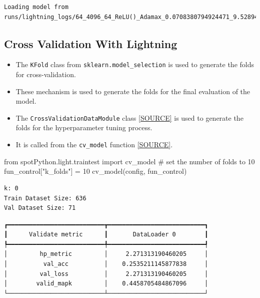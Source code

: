 \documentclass[
  letterpaper,
  DIV=11,
  numbers=noendperiod]{scrreprt}
\newenvironment{Shaded}{\begin{snugshade}}{\end{snugshade}}
\newcommand{\CommentTok}[1]{\textcolor[rgb]{0.37,0.37,0.37}{#1}}
\newcommand{\DecValTok}[1]{\textcolor[rgb]{0.68,0.00,0.00}{#1}}
\newcommand{\ImportTok}[1]{\textcolor[rgb]{0.00,0.46,0.62}{#1}}
\newcommand{\NormalTok}[1]{\textcolor[rgb]{0.00,0.23,0.31}{#1}}
\newcommand{\OperatorTok}[1]{\textcolor[rgb]{0.37,0.37,0.37}{#1}}
\newcommand{\StringTok}[1]{\textcolor[rgb]{0.13,0.47,0.30}{#1}}
\providecommand{\tightlist}{%
  \setlength{\itemsep}{0pt}\setlength{\parskip}{0pt}}\usepackage{longtable,booktabs,array}
\begin{document}
\begin{verbatim}
Loading model from runs/lightning_logs/64_4096_64_ReLU()_Adamax_0.0708380794924471_9.528945328733357_4_Xavier_TEST/checkpoints/last.ckpt
\end{verbatim}

\hypertarget{cross-validation-with-lightning}{%
\subsection{Cross Validation With
Lightning}\label{cross-validation-with-lightning}}

\begin{itemize}
\tightlist
\item
  The \texttt{KFold} class from \texttt{sklearn.model\_selection} is
  used to generate the folds for cross-validation.
\item
  These mechanism is used to generate the folds for the final evaluation
  of the model.
\item
  The \texttt{CrossValidationDataModule} class
  \href{https://github.com/sequential-parameter-optimization/spotPython/blob/main/src/spotPython/light/crossvalidationdatamodule.py}{{[}SOURCE{]}}
  is used to generate the folds for the hyperparameter tuning process.
\item
  It is called from the \texttt{cv\_model} function
  \href{https://github.com/sequential-parameter-optimization/spotPython/blob/main/src/spotPython/light/traintest.py}{{[}SOURCE{]}}.
\end{itemize}

\begin{Shaded}
\begin{Highlighting}[]
\ImportTok{from}\NormalTok{ spotPython.light.traintest }\ImportTok{import}\NormalTok{ cv\_model}
\CommentTok{\# set the number of folds to 10}
\NormalTok{fun\_control[}\StringTok{"k\_folds"}\NormalTok{] }\OperatorTok{=} \DecValTok{10}
\NormalTok{cv\_model(config, fun\_control)}
\end{Highlighting}
\end{Shaded}

\begin{verbatim}
k: 0
Train Dataset Size: 636
Val Dataset Size: 71
\end{verbatim}

\begin{verbatim}
┏━━━━━━━━━━━━━━━━━━━━━━━━━━━┳━━━━━━━━━━━━━━━━━━━━━━━━━━━┓
┃      Validate metric      ┃       DataLoader 0        ┃
┡━━━━━━━━━━━━━━━━━━━━━━━━━━━╇━━━━━━━━━━━━━━━━━━━━━━━━━━━┩
│         hp_metric         │     2.271313190460205     │
│          val_acc          │    0.2535211145877838     │
│         val_loss          │     2.271313190460205     │
│        valid_mapk         │    0.4458705484867096     │
└───────────────────────────┴───────────────────────────┘
\end{verbatim}
\end{document}
